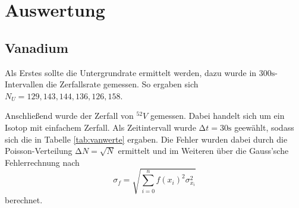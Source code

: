 \section{Auswertung}
\label{sec:Auswertung}

\subsection{Vanadium}
Als Erstes sollte die Untergrundrate ermittelt werden, dazu wurde in 
$300 \si{\s}$-Intervallen die Zerfallsrate gemessen. So ergaben sich
$N_U = {129, 143, 144, 136, 126, 158}$.

Anschließend wurde der Zerfall von $^{52}V$ gemessen. Dabei handelt sich um 
ein Isotop mit einfachem Zerfall. Als Zeitintervall wurde $\increment t = 30 \si{\s}$
geewählt, sodass sich die in Tabelle \ref{tab:vanwerte} ergaben. Die Fehler wurden dabei 
durch die Poisson-Verteilung $\increment N = \sqrt{N}$ ermittelt und im Weiteren über die 
Gauss'sche Fehlerrechnung nach 
\begin{equation}
\sigma_f = \sqrt{\sum_{i = 0}^n f(x_i)^2 \sigma_{x_i}^2}
\end{equation}
berechnet.

